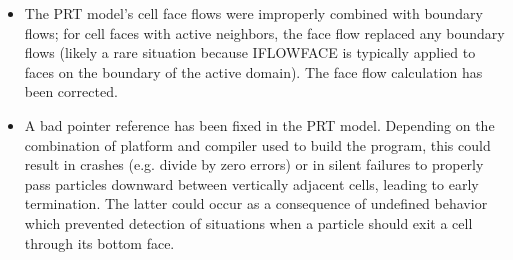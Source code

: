 \begin{itemize}
		\item The PRT model's cell face flows were improperly combined with boundary flows; for cell faces with active neighbors, the face flow replaced any boundary flows (likely a rare situation because IFLOWFACE is typically applied to faces on the boundary of the active domain). The face flow calculation has been corrected.
		\item A bad pointer reference has been fixed in the PRT model. Depending on the combination of platform and compiler used to build the program, this could result in crashes (e.g. divide by zero errors) or in silent failures to properly pass particles downward between vertically adjacent cells, leading to early termination. The latter could occur as a consequence of undefined behavior which prevented detection of situations when a particle should exit a cell through its bottom face.
	\end{itemize}







